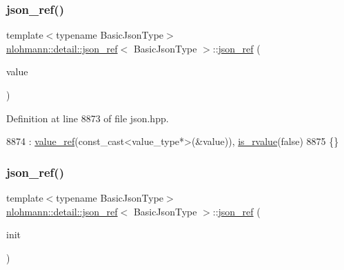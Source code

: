 \subsubsection{\texorpdfstring{json\+\_\+ref()}{json\_ref()}\hspace{0.1cm}{\footnotesize\ttfamily [2/6]}}
{\footnotesize\ttfamily template$<$typename Basic\+Json\+Type$>$ \\
\hyperlink{classnlohmann_1_1detail_1_1json__ref}{nlohmann\+::detail\+::json\+\_\+ref}$<$ Basic\+Json\+Type $>$\+::\hyperlink{classnlohmann_1_1detail_1_1json__ref}{json\+\_\+ref} (\begin{DoxyParamCaption}\item[{const \hyperlink{classnlohmann_1_1detail_1_1json__ref_a78d76cf288141049568c0d670ed670ef}{value\+\_\+type} \&}]{value }\end{DoxyParamCaption})\hspace{0.3cm}{\ttfamily [inline]}}



Definition at line 8873 of file json.\+hpp.


\begin{DoxyCode}
8874         : \hyperlink{classnlohmann_1_1detail_1_1json__ref_a23504615c2076070d5e087443bb376a4}{value\_ref}(const\_cast<value\_type*>(&value)), \hyperlink{classnlohmann_1_1detail_1_1json__ref_a434d1e18c21cc1b61954ba22b62ee7a5}{is\_rvalue}(\textcolor{keyword}{false})
8875     \{\}
\end{DoxyCode}
\mbox{\label{classnlohmann_1_1detail_1_1json__ref_adfba2db547283a7c6a5df9a32e72efc5}} 
\subsubsection{\texorpdfstring{json\+\_\+ref()}{json\_ref()}\hspace{0.1cm}{\footnotesize\ttfamily [3/6]}}
{\footnotesize\ttfamily template$<$typename Basic\+Json\+Type$>$ \\
\hyperlink{classnlohmann_1_1detail_1_1json__ref}{nlohmann\+::detail\+::json\+\_\+ref}$<$ Basic\+Json\+Type $>$\+::\hyperlink{classnlohmann_1_1detail_1_1json__ref}{json\+\_\+ref} (\begin{DoxyParamCaption}\item[{std\+::initializer\+\_\+list$<$ \hyperlink{classnlohmann_1_1detail_1_1json__ref}{json\+\_\+ref}$<$ Basic\+Json\+Type $>$ $>$}]{init }\end{DoxyParamCaption})\hspace{0.3cm}{\ttfamily [inline]}}



